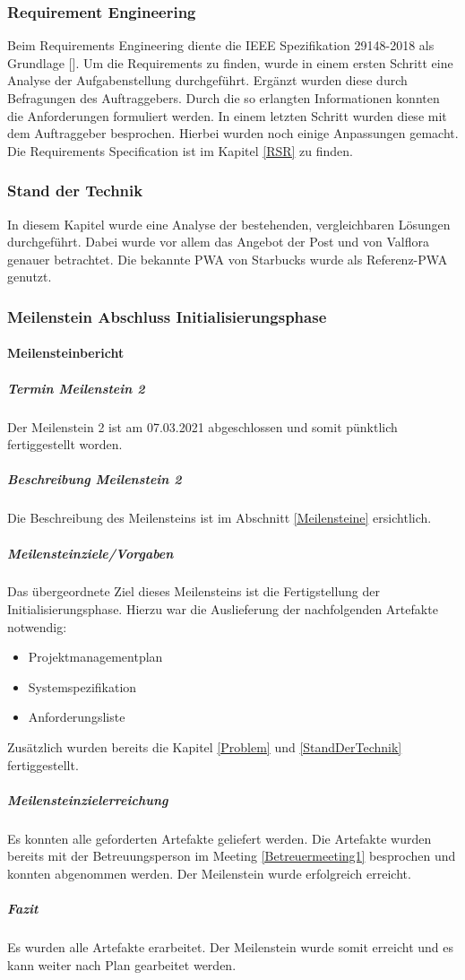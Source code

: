 \subsubsection{Requirement Engineering}
Beim Requirements Engineering diente die IEEE Spezifikation 29148-2018 als Grundlage [\cite{ieeeSrs}]. Um die Requirements zu finden, wurde in einem ersten Schritt eine Analyse der Aufgabenstellung durchgeführt. Ergänzt wurden diese durch Befragungen des Auftraggebers. Durch die so erlangten Informationen konnten die Anforderungen formuliert werden. In einem letzten Schritt wurden diese mit dem Auftraggeber besprochen. Hierbei wurden noch einige Anpassungen gemacht. Die Requirements Specification ist im Kapitel \ref{RSR} zu finden. 
\subsubsection{Stand der Technik}
In diesem Kapitel wurde eine Analyse der bestehenden, vergleichbaren Lösungen durchgeführt. Dabei wurde vor allem das Angebot der Post und von Valflora genauer betrachtet. Die bekannte \gls{PWA} von Starbucks wurde als Referenz-\ac{PWA} genutzt. 
\subsubsection{Meilenstein Abschluss Initialisierungsphase}
\paragraph{Meilensteinbericht}
\subparagraph{Termin Meilenstein 2}
Der Meilenstein 2 ist am 07.03.2021 abgeschlossen und somit pünktlich fertiggestellt worden.
\subparagraph{Beschreibung Meilenstein 2}
Die Beschreibung des Meilensteins ist im Abschnitt \ref{Meilensteine} ersichtlich. 
\subparagraph{Meilensteinziele/Vorgaben}
Das übergeordnete Ziel dieses Meilensteins ist die Fertigstellung der Initialisierungsphase.
Hierzu war die Auslieferung der nachfolgenden Artefakte notwendig:
\begin{itemize}
	\item Projektmanagementplan
	\item Systemspezifikation
	\item Anforderungsliste
\end{itemize}
Zusätzlich wurden bereits die Kapitel \ref{Problem} und \ref{StandDerTechnik} fertiggestellt. 
\subparagraph{Meilensteinzielerreichung}
Es konnten alle geforderten Artefakte geliefert werden. Die Artefakte wurden bereits mit der Betreuungsperson im Meeting \ref{Betreuermeeting1} besprochen und konnten abgenommen werden. 
Der Meilenstein wurde erfolgreich erreicht. 
\subparagraph{Fazit}
Es wurden alle Artefakte erarbeitet. Der Meilenstein wurde somit erreicht und es kann weiter nach Plan gearbeitet werden.

